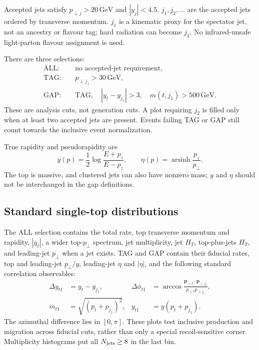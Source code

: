 \documentclass[11pt,a4paper]{article}
\newcommand{\GeV}{\,\mathrm{GeV}}
\begin{document}
Accepted jets satisfy $p_{\perp j}>20\GeV$ and $|y_j|<4.5$.
$j_1,j_2,\ldots$ are the accepted jets ordered by transverse momentum.
$j_1$ is a kinematic proxy for the spectator jet, not an ancestry or flavour
tag; hard radiation can become $j_1$. No infrared-unsafe light-parton flavour
assignment is used.

There are three selections:
\begin{align}
 \mathrm{ALL}:&\quad\text{no accepted-jet requirement},\\
 \mathrm{TAG}:&\quad p_{\perp j_1}>30\GeV,\\
 \mathrm{GAP}:&\quad\mathrm{TAG},\quad
            |y_t-y_{j_1}|>3,\quad m(t,j_1)>500\GeV.
\end{align}
These are analysis cuts, not generation cuts. A plot requiring $j_2$ is
filled only when at least two accepted jets are present. Events failing
TAG or GAP still count towards the inclusive event normalization.

True rapidity and pseudorapidity are
\begin{equation}
 y(p)=\frac12\log\frac{E+p_z}{E-p_z},\qquad
 \eta(p)=\operatorname{arsinh}\frac{p_z}{p_\perp}.
\end{equation}
The top is massive, and clustered jets can also have nonzero mass; $y$ and
$\eta$ should not be interchanged in the gap definitions.

\subsection{Standard single-top distributions}

The ALL selection contains the total rate, top transverse momentum and
rapidity, $|y_t|$, a wider top-$p_\perp$ spectrum, jet multiplicity, jet
$H_T$, top-plus-jets $H_T$, and leading-jet $p_\perp$ when a jet exists.
TAG and GAP contain their fiducial rates, top and leading-jet $p_\perp/y$,
leading-jet $\eta$ and $|\eta|$, and the following standard correlation
observables:
\begin{align}
 \Delta y_{t1}&=y_t-y_{j_1},&
 \Delta\phi_{t1}&=\arccos\frac{\boldsymbol p_{\perp t}\cdot
                  \boldsymbol p_{\perp j_1}}{p_{\perp t}p_{\perp j_1}},\\
 m_{t1}&=\sqrt{(p_t+p_{j_1})^2},&
 y_{t1}&=y(p_t+p_{j_1}).
\end{align}
The azimuthal difference lies in $[0,\pi]$. These plots test inclusive
production and migration across fiducial cuts, rather than only a special
recoil-sensitive corner. Multiplicity histograms put all $N_{\rm jets}\geq8$
in the last bin.
\end{document}

